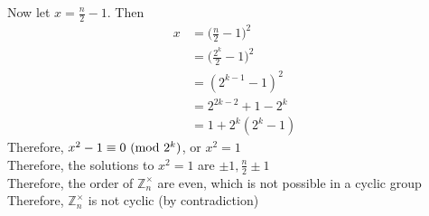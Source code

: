 \documentclass[paper=usletter, fontsize=12pt]{article}
\begin{document}
\begin{itemize}
\begin{itemize}
\begin{cproof}
                Now let $x=\frac{n}{2}-1$. Then
                \begin{align*}
                    x & = \bigg(\frac{n}{2}-1\bigg)^2\\
                    & = \bigg(\frac{2^k}{2}-1\bigg)^2\\
                    & = (2^{k-1}-1)^2\\
                    & = 2^{2k-2}+1-2^k\\
                    & = 1+2^k(2^k-1)
                \end{align*}
                \endgroup
                Therefore, $x^2 - 1 \equiv 0 \ (\mathrm{mod}\ 2^k)$, or $x^2=1$\\

                Therefore, the solutions to $x^2=1$ are $\pm 1,
                \frac{n}{2}\pm1$\\
                Therefore, the order of $\mathbb{Z}_{n}^{\times}$ are even,
                which is not possible in a cyclic group\\
                Therefore, $\mathbb{Z}_{n}^{\times}$ is not cyclic (by
                contradiction) \qedhere

            \end{cproof}

        \end{itemize}

    \end{itemize}
\end{document}
